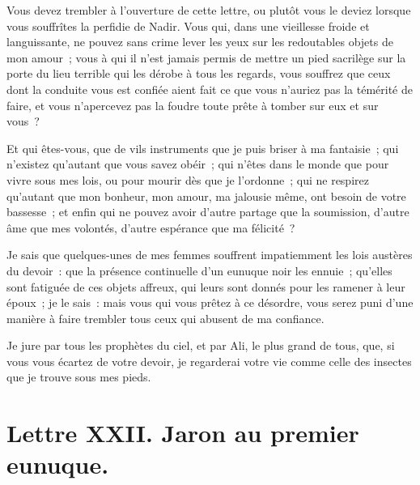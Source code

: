 \documentclass[french,twoside]{book} %
\newcommand{\dateline}[1]{\medskip{\RaggedLeft{#1}\par}\bigskip}
\begin{document}
\noindent Vous devez trembler à l’ouverture de cette lettre, ou plutôt vous le deviez lorsque vous souffrîtes la perfidie de Nadir. Vous qui, dans une vieillesse froide et languissante, ne pouvez sans crime lever les yeux sur les redoutables objets de mon amour ; vous à qui il n’est jamais permis de mettre un pied sacrilège sur la porte du lieu terrible qui les dérobe à tous les regards, vous souffrez que ceux dont la conduite vous est confiée aient fait ce que vous n’auriez pas la témérité de faire, et vous n’apercevez pas la foudre toute prête à tomber sur eux et sur vous ?\par
Et qui êtes-vous, que de vils instruments que je puis briser à ma fantaisie ; qui n’existez qu’autant que vous savez obéir ; qui n’êtes dans le monde que pour vivre sous mes lois, ou pour mourir dès que je l’ordonne ; qui ne respirez qu’autant que mon bonheur, mon amour, ma jalousie même, ont besoin de votre bassesse ; et enfin qui ne pouvez avoir d’autre partage que la soumission, d’autre âme que mes volontés, d’autre espérance que ma félicité ?\par
Je sais que quelques-unes de mes femmes souffrent impatiemment les lois austères du devoir : que la présence continuelle d’un eunuque noir les ennuie ; qu’elles sont fatiguée de ces objets affreux, qui leurs sont donnés pour les ramener à leur époux ; je le sais : mais vous qui vous prêtez à ce désordre, vous serez puni d’une manière à faire trembler tous ceux qui abusent de ma confiance.\par
Je jure par tous les prophètes du ciel, et par Ali, le plus grand de tous, que, si vous vous écartez de votre devoir, je regarderai votre vie comme celle des insectes que je trouve sous mes pieds.\par

\dateline{À Smyrne, le 13 de la lune de Zilcadé, 1711.}
\section[{Lettre XXII. Jaron au premier eunuque.}]{Lettre XXII. Jaron au premier eunuque.}\renewcommand{\leftmark}{Lettre XXII. Jaron au premier eunuque.}
\end{document}
